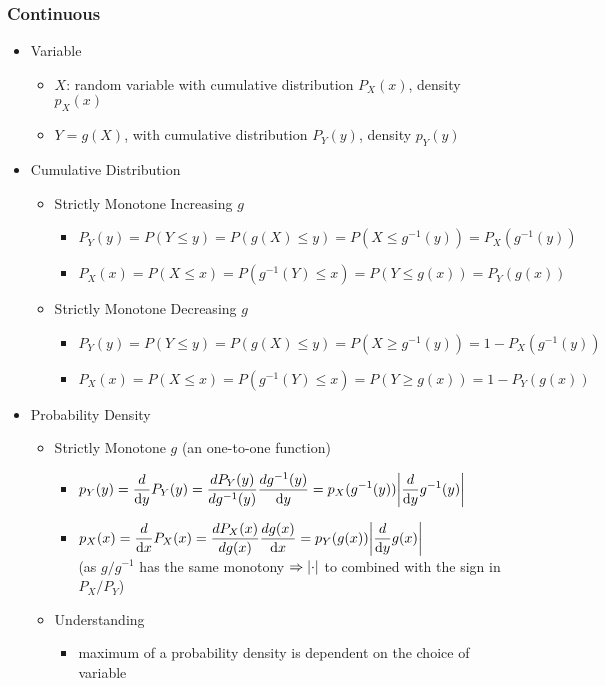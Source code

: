\subsubsection{Continuous}
\begin{itemize}
\item Variable
	\begin{itemize}
	\item $X$: random variable with cumulative distribution $P_X(x)$, density $p_X(x)$
	\item $Y=g(X)$, with cumulative distribution $P_Y(y)$, density $p_Y(y)$
	\end{itemize}

\item Cumulative Distribution
	\begin{itemize}
	\item Strictly Monotone Increasing $g$
		\begin{itemize}
		\item $P_Y(y) = P(Y\le y) = P(g(X) \le y) = P(X \le g^{-1}(y)) = P_X(g^{-1}(y))$
		\item $P_X(x) = P(X\le x) = P(g^{-1}(Y) \le x) = P(Y \le g(x)) = P_Y(g(x))$
		\end{itemize}
	\item Strictly Monotone Decreasing $g$
		\begin{itemize}
		\item $P_Y(y) = P(Y\le y) = P(g(X) \le y) = P(X \ge g^{-1}(y)) = 1 - P_X(g^{-1}(y))$
		\item $P_X(x) = P(X\le x) = P(g^{-1}(Y) \le x) = P(Y \ge g(x)) = 1 - P_Y(g(x))$
		\end{itemize}
	\end{itemize}

\item Probability Density
	\begin{itemize}
	\item Strictly Monotone $g$ (an one-to-one function)
		\begin{itemize}
		\item $\displaystyle p_Y(y) = \frac d {\D y} P_Y(y) = \frac {d P_Y(y)}{d\space  g^{-1}(y)} \frac{d \space g^{-1}(y)}{\D y} = p_X(g^{-1}(y)) \abs*{\frac{d}{\D y} g^{-1}(y)}$
		\item $\displaystyle p_X(x) = \frac d {\D x} P_X(x) = \frac {d P_X(x)}{d\space  g(x)} \frac{d \space g(x)}{\D x} = p_Y(g(x)) \abs*{\frac{d}{\D y} g(x)}$ \\
		(as $g/g^{-1}$ has the same monotony $\Rightarrow\abs*\cdot$ to combined with the sign in $P_X/P_Y$)
		\end{itemize}
	\item Understanding
		\begin{itemize}
		\item maximum of a probability density is dependent on the choice of variable
		\end{itemize}
	\end{itemize}
\end{itemize}

